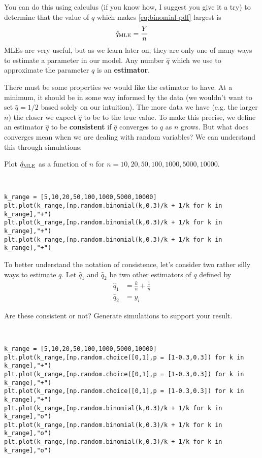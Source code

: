 You can do this using calculus (if you know how, I suggest you give it a try) to determine that the value of $q$ which makes \eqref{eq:binomial-pdf} largest is \begin{equation}
\hat{q}_{\rm MLE} = \frac{Y}{n}
\end{equation}
MLEs are very useful, but as we learn later on, they are only one of many ways to estimate a parameter in our model. Any number $\hat{q}$ which we use to approximate the parameter $q$ is an {\bf estimator}. 

There must be some properties we would like the estimator to have. At a minimum, it should be in some way informed by the data (we wouldn't want to set $\hat{q} = 1/2$ based solely on our intuition). The more data we have (e.g. the larger $n$) the closer we expect $\hat{q}$ to be to the true value. To make this precise, we define an estimator $\hat{q}$ to be {\bf consistent} if $\hat{q}$ converges to $q$ as $n$ grows. But what does converges mean when we are dealing with random variables? We can understand this through simulations: 

\begin{example}
Plot $\hat{q}_{\rm MLE}$ as a function of $n$ for $n = 10,20,50,100,1000,5000,10000$. 
\end{example} 
\begin{solution}
\,
\begin{Verbatim}
k_range = [5,10,20,50,100,1000,5000,10000]
plt.plot(k_range,[np.random.binomial(k,0.3)/k + 1/k for k in k_range],"+")
plt.plot(k_range,[np.random.binomial(k,0.3)/k + 1/k for k in k_range],"+")
plt.plot(k_range,[np.random.binomial(k,0.3)/k + 1/k for k in k_range],"+")
\end{Verbatim}
\end{solution}

To better understand the notation of consistence, let's consider two rather silly ways to estimate $q$. Let $\hat{q}_1$ and $\hat{q}_2$ be two other estimators of $q$ defined by 
\begin{align}
\hat{q}_{1} &= \frac{k}{n} + \frac{1}{n}\\
\hat{q}_{2} &= y_i
\end{align}

\begin{exercise}
Are these consistent or not? Generate simulations to support your result. 
\end{exercise} 

\begin{solution}
\,
\begin{Verbatim}
k_range = [5,10,20,50,100,1000,5000,10000]
plt.plot(k_range,[np.random.choice([0,1],p = [1-0.3,0.3]) for k in k_range],"+")
plt.plot(k_range,[np.random.choice([0,1],p = [1-0.3,0.3]) for k in k_range],"+")
plt.plot(k_range,[np.random.choice([0,1],p = [1-0.3,0.3]) for k in k_range],"+")
plt.plot(k_range,[np.random.binomial(k,0.3)/k + 1/k for k in k_range],"o")
plt.plot(k_range,[np.random.binomial(k,0.3)/k + 1/k for k in k_range],"o")
plt.plot(k_range,[np.random.binomial(k,0.3)/k + 1/k for k in k_range],"o")
\end{Verbatim}
\end{solution}

